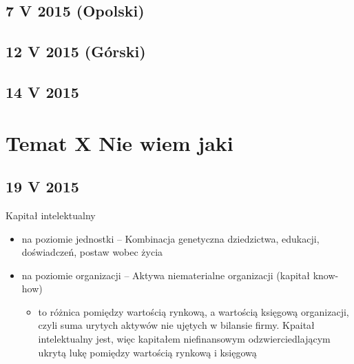 \documentclass[a4paper,10pt]{report}
\begin{document}
\section{7 V 2015 (Opolski)}

\section{12 V 2015 (Górski) }

\section{14 V 2015}

\chapter{Temat X Nie wiem jaki}

\section{19 V 2015}

Kapitał intelektualny
\begin{itemize}
	\item na poziomie jednostki -- Kombinacja genetyczna dziedzictwa, edukacji, doświadczeń, postaw wobec życia
	\item na poziomie organizacji -- Aktywa niematerialne organizacji (kapitał know-how)
	\begin{itemize}
		\item to różnica pomiędzy wartością rynkową, a wartością księgową organizacji, czyli suma urytych aktywów nie ujętych w bilansie firmy. Kpaitał intelektualny jest, więc kapitałem niefinansowym odzwierciedlającym ukrytą lukę pomiędzy wartością rynkową i księgową
	\end{itemize}
\end{itemize}
\end{document}
